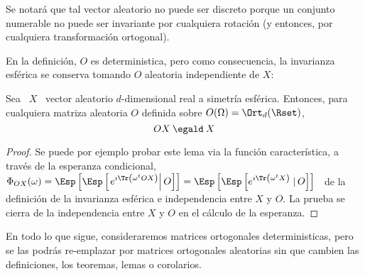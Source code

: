 Se notar\'a  que tal vector aleatorio  no puede ser discreto  porque un conjunto
numerable  no puede  ser invariante  por cualquiera  rotaci\'on (y  entonces, por
cualquiera transformaci\'on ortogonal).

En la definici\'on, $O$ es deterministica, pero como consecuencia, la invarianza
esf\'erica se conserva tomando $O$ aleatoria independiente de $X$:
%
\begin{lema}\label{Lem:MP:SIAleatoria}

  Sea   \   $X$  \   vector   aleatorio   $d$-dimensional   real  a   simetr\'ia
  esf\'erica.  Entonces, para  cualquiera  matriza aleatoria  $O$ definida  sobre
  $O(\Omega) = \Ort_d(\Rset)$,
  \[
  O  X  \: \egald  \: X
  \]
\end{lema}
\begin{proof}
  Se puede  por ejemplo  probar este lema  via la funci\'on  caracter\'istica, a
  trav\'es  de  la  esperanza  condicional,  $\Phi_{O  X}(\omega)  =  \Esp\left[
    \Esp\left[  \left.  e^{\imath  \Tr\left(  \omega^t O  X  \right)} \right|  O
    \right]  \right]  = \Esp\left[  \Esp\left[  e^{\imath  \Tr\left( \omega^t  X
        \right)} \left.  \right|  O \right] \right]$ \ de  la definici\'on de la
  invarianza esf\'erica e independencia entre $X$ y $O$.  La prueba se cierra de
  la independencia entre $X$ y $O$ en el c\'alculo de la esperanza.
\end{proof}

En todo lo que  sigue, consideraremos matrices ortogonales deterministicas, pero
se las podr\'as re-emplazar por  matrices ortogonales aleatorias sin que cambien
las definiciones, los teoremas, lemas o corolarios.

